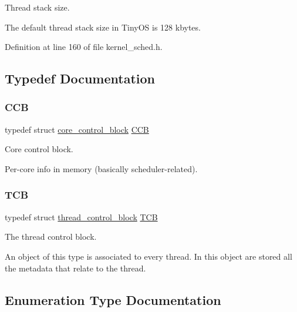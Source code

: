 Thread stack size. 

The default thread stack size in Tiny\+OS is 128 kbytes. 

Definition at line 160 of file kernel\+\_\+sched.\+h.



\subsection{Typedef Documentation}
\mbox{\label{group__scheduler_ga7485b31e0dd9fd723bc2d75fba5206a0}} 
\subsubsection{\texorpdfstring{C\+CB}{CCB}}
{\footnotesize\ttfamily typedef struct \hyperlink{structcore__control__block}{core\+\_\+control\+\_\+block}  \hyperlink{group__scheduler_ga7485b31e0dd9fd723bc2d75fba5206a0}{C\+CB}}



Core control block. 

Per-\/core info in memory (basically scheduler-\/related). \mbox{\label{group__scheduler_gaf88d9c946bf70b36a1e8bc34383abfc9}} 
\subsubsection{\texorpdfstring{T\+CB}{TCB}}
{\footnotesize\ttfamily typedef struct \hyperlink{structthread__control__block}{thread\+\_\+control\+\_\+block}  \hyperlink{group__scheduler_gaf88d9c946bf70b36a1e8bc34383abfc9}{T\+CB}}



The thread control block. 

An object of this type is associated to every thread. In this object are stored all the metadata that relate to the thread. 

\subsection{Enumeration Type Documentation}
\mbox{\label{group__scheduler_gaad787d8d80312ffca3c0f197b3a25fbe}} 
